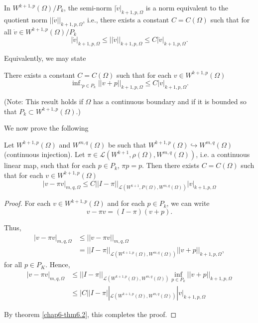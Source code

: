 \begin{theorem}\label{chap6-thm6.1}
In $W^{k+1,p}(\Omega)/P_{k}$, the semi-norm $|\dot{v}|_{k+1,p,\Omega}$
is a norm \break equivalent to the quotient norm
$||\dot{v}||_{k+1,p,\Omega}$, i.e., there exists a constant
$C=C(\Omega)$ such that for all $\dot{v}\in W^{k+1,p}(\Omega)/P_{k}$ 
\begin{equation*}
|\dot{v}|_{k+1,p,\Omega}\leq ||\dot{v}||_{k+1,p,\Omega}\leq
C|\dot{v}|_{k+1,p,\Omega}.\tag{6.8}\label{chap6-eq6.8} 
\end{equation*}
\end{theorem}

Equivalently, we may state

\begin{theorem}\label{chap6-thm6.2}
There exists a constant $C=C(\Omega)$ such that for each $v\in
W^{k+1,p}(\Omega)$ 
\begin{equation*}
{\displaystyle{\mathop{\text{inf.}}_{p\in
      P_{k}}}}||v+p||_{k+1,p,\Omega}\leq
C|v|_{k+1,p,\Omega}.\tag{6.9}\label{chap6-eq6.9} 
\end{equation*}
\end{theorem}
\noindent
(Note: This result holds if $\Omega$ has a continuous boundary and if
it is bounded so that $P_{k}\subset W^{k+1,p}(\Omega)$.)

We now prove the following

\begin{theorem}\label{chap6-thm6.3}
Let $W^{k+1,p}(\Omega)$ and $W^{m,q}(\Omega)$ be such that
$W^{k+1,p}(\Omega)\hookrightarrow W^{m,q}(\Omega)$ (continuous
injection). Let
$\pi\in\mathscr{L}(W^{k+1},\rho(\Omega),W^{m,q}(\Omega))$, i.e. a
continuous linear map, such that for each $p\in P_{k}$, $\pi
p=p$. Then there exists $C=C(\Omega)$ such that for each $v\in
W^{k+1,p}(\Omega)$ 
\begin{equation*}
|v-\pi v|_{m,q,\Omega}\leq
C||I-\pi||_{\mathscr{L}(W^{k+1},P(\Omega),W^{m,q}(\Omega))}|v|_{k+1,p,\Omega} 
\end{equation*}\pageoriginale
\end{theorem}

\begin{proof}
For each $v\in W^{k+1,p}(\Omega)$ and for each $p\in P_{k}$, we can
write 
$$
v-\pi v=(I-\pi)(v+p).
$$

Thus,
\begin{align*}
|v-\pi v|_{m,q,\Omega} &\leq ||v-\pi v||_{m,q,\Omega}\\
&=
  ||I-\pi||_{\mathscr{L}(W^{k+1,p}(\Omega),W^{m,q}(\Omega))}||v+p||_{k+1,p,\Omega}, 
\end{align*}
for all $p\in P_{K}$. Hence,
\begin{align*}
|v-\pi v|_{m,q,\Omega} &\leq
||I-\pi||_{\mathscr{L}(W^{k+1,p}(\Omega),W^{m,q}(\Omega))}\inf\limits_{p\in
P_{k}}||v+p||_{k+1,p,\Omega}\\ 
&\leq
|C||I-\pi||_{\mathscr{L}(W^{k+1,p}(\Omega),W^{m,q}(\Omega))}|v|_{k+1,p,\Omega} 
\end{align*}

By theorem \ref{chap6-thm6.2}, this completes the proof.
\end{proof}

